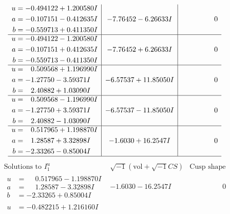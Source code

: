 \documentclass[1p]{elsarticle_modified}
\theoremstyle{definition}
\newcommand{\I}{\sqrt{-1}}
\begin{document}
$$\begin{array}{c|c|c}
\begin{aligned}
u &= -0.494122 + 1.200580 I \\
a &= -0.107151 - 0.412635 I \\
b &= -0.559713 + 0.411350 I\end{aligned}
 & -7.76452 - 6.26633 I & \phantom{-0.000000 } 0 \\ \hline\begin{aligned}
u &= -0.494122 - 1.200580 I \\
a &= -0.107151 + 0.412635 I \\
b &= -0.559713 - 0.411350 I\end{aligned}
 & -7.76452 + 6.26633 I & \phantom{-0.000000 } 0 \\ \hline\begin{aligned}
u &= \phantom{-}0.509568 + 1.196990 I \\
a &= -1.27750 - 3.59371 I \\
b &= \phantom{-}2.40882 + 1.03090 I\end{aligned}
 & -6.57537 + 11.85050 I & \phantom{-0.000000 } 0 \\ \hline\begin{aligned}
u &= \phantom{-}0.509568 - 1.196990 I \\
a &= -1.27750 + 3.59371 I \\
b &= \phantom{-}2.40882 - 1.03090 I\end{aligned}
 & -6.57537 - 11.85050 I & \phantom{-0.000000 } 0 \\ \hline\begin{aligned}
u &= \phantom{-}0.517965 + 1.198870 I \\
a &= \phantom{-}1.28587 + 3.32898 I \\
b &= -2.33265 - 0.85004 I\end{aligned}
 & -1.6030 + 16.2547 I & \phantom{-0.000000 } 0\\
 \hline 
 \end{array}$$\newpage$$\begin{array}{c|c|c}  
\text{Solutions to }I^u_{1}& \I (\text{vol} + \sqrt{-1}CS) & \text{Cusp shape}\\
 \hline 
\begin{aligned}
u &= \phantom{-}0.517965 - 1.198870 I \\
a &= \phantom{-}1.28587 - 3.32898 I \\
b &= -2.33265 + 0.85004 I\end{aligned}
 & -1.6030 - 16.2547 I & \phantom{-0.000000 } 0 \\ \hline\begin{aligned}
u &= -0.482215 + 1.216160 I \\

\end{aligned}
\end{array}$$
\end{document}
